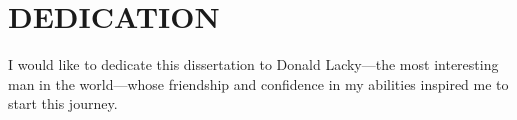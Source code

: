 \chapter*{DEDICATION}
I would like to dedicate this dissertation to Donald Lacky---the most interesting man in the world---whose friendship and confidence in my abilities inspired me to start this journey.  


